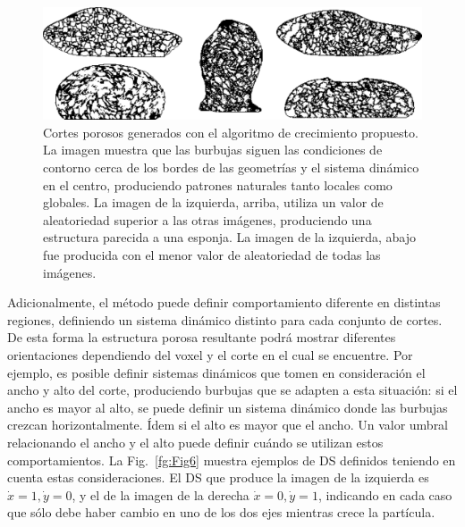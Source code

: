 
\begin{figure}
  \centerline{\includegraphics[width=12cm]{figures/Fig5}}
  \caption[Cortes porosos generados con el algoritmo de crecimiento propuesto]{Cortes porosos generados con el algoritmo de crecimiento propuesto. La imagen muestra que las burbujas siguen las condiciones de contorno cerca de los bordes de las geometrías y el sistema dinámico en el centro, produciendo patrones naturales tanto locales como globales. La imagen de la izquierda, arriba, utiliza un valor de aleatoriedad superior a las otras imágenes, produciendo una estructura parecida a una esponja. La imagen de la izquierda, abajo fue producida con el menor valor de aleatoriedad de todas las imágenes.}
  \label{fg:Fig5}
\end{figure}

Adicionalmente, el método puede definir comportamiento diferente en distintas regiones, definiendo un sistema dinámico distinto para cada conjunto de cortes.
De esta forma la estructura porosa resultante podrá mostrar diferentes orientaciones dependiendo del voxel y el corte en el cual se encuentre.
Por ejemplo, es posible definir sistemas dinámicos que tomen en consideración el ancho y alto del corte, produciendo burbujas que se adapten a esta situación: si el ancho es mayor al alto, se puede definir un sistema dinámico donde las burbujas crezcan horizontalmente.
Ídem si el alto es mayor que el ancho.
Un valor umbral relacionando el ancho y el alto puede definir cuándo se utilizan estos comportamientos.
La Fig.~\ref{fg:Fig6} muestra ejemplos de DS definidos teniendo en cuenta estas consideraciones.
El DS que produce la imagen de la izquierda es $\dot{x} = 1, \dot{y} = 0$, y el de la imagen de la derecha $\dot{x} = 0, \dot{y} = 1$, indicando en cada caso que sólo debe haber cambio en uno de los dos ejes mientras crece la partícula.

